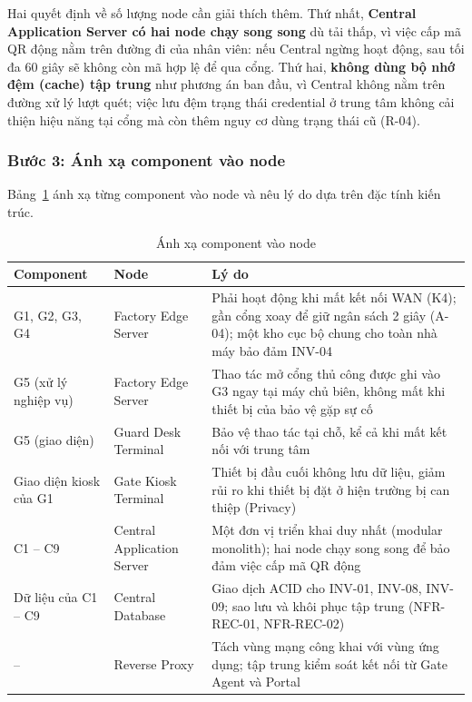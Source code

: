 Hai quyết định về số lượng node cần giải thích thêm. Thứ nhất, \textbf{Central Application Server có hai node chạy song song} dù tải thấp, vì việc cấp mã QR động nằm trên đường đi của nhân viên: nếu Central ngừng hoạt động, sau tối đa 60 giây sẽ không còn mã hợp lệ để qua cổng. Thứ hai, \textbf{không dùng bộ nhớ đệm (cache) tập trung} như phương án ban đầu, vì Central không nằm trên đường xử lý lượt quét; việc lưu đệm trạng thái credential ở trung tâm không cải thiện hiệu năng tại cổng mà còn thêm nguy cơ dùng trạng thái cũ (R-04).

\subsubsection{Bước 3: Ánh xạ component vào node}\label{sec:physical-step3}
Bảng~\ref{tab:component-node} ánh xạ từng component vào node và nêu lý do dựa trên đặc tính kiến trúc.

\begin{table}[H]
\centering
\caption{Ánh xạ component vào node}\label{tab:component-node}
\small
\renewcommand{\arraystretch}{1.3}
\begin{tabularx}{\textwidth}{|>{\raggedright\arraybackslash}p{3.4cm}|>{\raggedright\arraybackslash}p{3.6cm}|>{\raggedright\arraybackslash}X|}
\hline
\textbf{Component} & \textbf{Node} & \textbf{Lý do} \\
\hline
G1, G2, G3, G4 & Factory Edge Server & Phải hoạt động khi mất kết nối WAN (K4); gần cổng xoay để giữ ngân sách 2 giây (A-04); một kho cục bộ chung cho toàn nhà máy bảo đảm INV-04 \\
\hline
G5 (xử lý nghiệp vụ) & Factory Edge Server & Thao tác mở cổng thủ công được ghi vào G3 ngay tại máy chủ biên, không mất khi thiết bị của bảo vệ gặp sự cố \\
\hline
G5 (giao diện) & Guard Desk Terminal & Bảo vệ thao tác tại chỗ, kể cả khi mất kết nối với trung tâm \\
\hline
Giao diện kiosk của G1 & Gate Kiosk Terminal & Thiết bị đầu cuối không lưu dữ liệu, giảm rủi ro khi thiết bị đặt ở hiện trường bị can thiệp (Privacy) \\
\hline
C1 -- C9 & Central Application Server & Một đơn vị triển khai duy nhất (modular monolith); hai node chạy song song để bảo đảm việc cấp mã QR động \\
\hline
Dữ liệu của C1 -- C9 & Central Database & Giao dịch ACID cho INV-01, INV-08, INV-09; sao lưu và khôi phục tập trung (NFR-REC-01, NFR-REC-02) \\
\hline
-- & Reverse Proxy & Tách vùng mạng công khai với vùng ứng dụng; tập trung kiểm soát kết nối từ Gate Agent và Portal \\
\hline
\end{tabularx}
\end{table}

